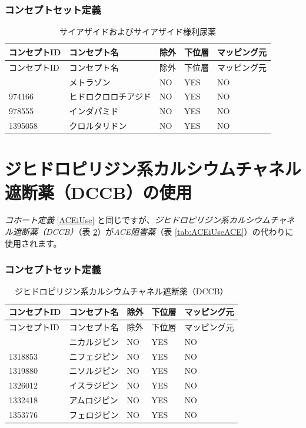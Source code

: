 \documentclass[
  11pt]{book}
\theoremstyle{definition}
\theoremstyle{definition}
\theoremstyle{definition}
\theoremstyle{definition}
\theoremstyle{remark}
\begin{document}
\subsubsection*{コンセプトセット定義}\label{ux30b3ux30f3ux30bbux30d7ux30c8ux30bbux30c3ux30c8ux5b9aux7fa9-8}

\begin{longtable}[]{@{}lllll@{}}
\caption{\label{tab:THZUseTHZ} サイアザイドおよびサイアザイド様利尿薬}\tabularnewline
\toprule\noalign{}
コンセプトID & コンセプト名 & 除外 & 下位層 & マッピング元 \\
\midrule\noalign{}
\endfirsthead
\toprule\noalign{}
コンセプトID & コンセプト名 & 除外 & 下位層 & マッピング元 \\
\midrule\noalign{}
\endhead
\bottomrule\noalign{}
\endlastfoot
907013 & メトラゾン & NO & YES & NO \\
974166 & ヒドロクロロチアジド & NO & YES & NO \\
978555 & インダパミド & NO & YES & NO \\
1395058 & クロルタリドン & NO & YES & NO \\
\end{longtable}

\section{ジヒドロピリジン系カルシウムチャネル遮断薬（DCCB）の使用}\label{dCCBUse}

\emph{コホート定義} \ref{ACEiUse} と同じですが、\emph{ジヒドロピリジン系カルシウムチャネル遮断薬（DCCB）}（表 \ref{tab:dCCBUsedCBB}）が\emph{ACE阻害薬}（表 \ref{tab:ACEiUseACE}）の代わりに使用されます。

\subsubsection*{コンセプトセット定義}\label{ux30b3ux30f3ux30bbux30d7ux30c8ux30bbux30c3ux30c8ux5b9aux7fa9-9}

\begin{longtable}[]{@{}lllll@{}}
\caption{\label{tab:dCCBUsedCBB} ジヒドロピリジン系カルシウムチャネル遮断薬（DCCB）}\tabularnewline
\toprule\noalign{}
コンセプトID & コンセプト名 & 除外 & 下位層 & マッピング元 \\
\midrule\noalign{}
\endfirsthead
\toprule\noalign{}
コンセプトID & コンセプト名 & 除外 & 下位層 & マッピング元 \\
\midrule\noalign{}
\endhead
\bottomrule\noalign{}
\endlastfoot
1318137 & ニカルジピン & NO & YES & NO \\
1318853 & ニフェジピン & NO & YES & NO \\
1319880 & ニソルジピン & NO & YES & NO \\
1326012 & イスラジピン & NO & YES & NO \\
1332418 & アムロジピン & NO & YES & NO \\
1353776 & フェロジピン & NO & YES & NO \\
\end{longtable}
\end{document}
